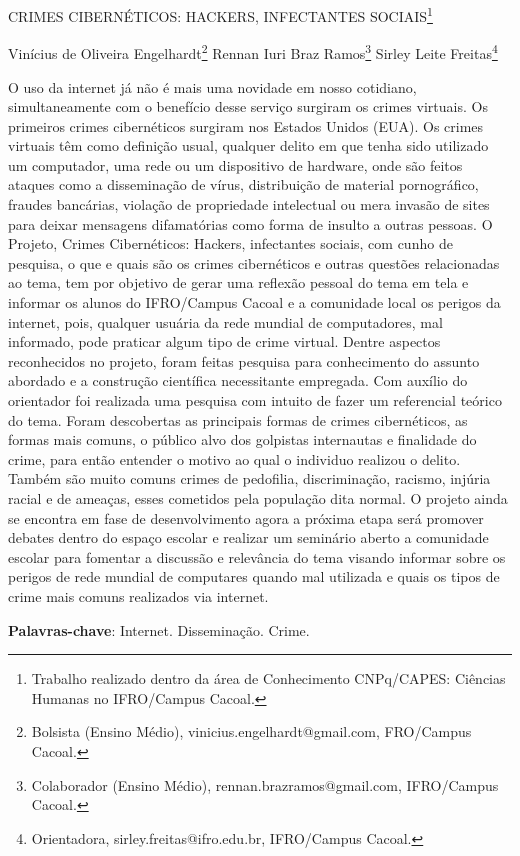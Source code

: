 \documentclass[article,12pt,onesidea,4paper,english,brazil]{abntex2}
\begin{document}
	
	
	\frenchspacing 
	
	\begin{center}
		\LARGE CRIMES CIBERNÉTICOS: HACKERS, INFECTANTES SOCIAIS\footnote{Trabalho realizado dentro da área de Conhecimento CNPq/CAPES: Ciências Humanas no IFRO/Campus Cacoal.}
		
		\normalsize
		Vinícius de Oliveira Engelhardt\footnote{Bolsista (Ensino Médio), vinicius.engelhardt@gmail.com, FRO/Campus Cacoal.} 
		Rennan Iuri Braz Ramos\footnote{Colaborador (Ensino Médio), rennan.brazramos@gmail.com, IFRO/Campus Cacoal.} 
		Sirley Leite Freitas\footnote{Orientadora, sirley.freitas@ifro.edu.br, IFRO/Campus Cacoal.} 
	\end{center}
	
	\noindent O uso da internet já não é mais uma novidade em nosso cotidiano, simultaneamente com o benefício desse serviço surgiram os crimes virtuais. Os primeiros crimes cibernéticos surgiram nos Estados Unidos (EUA). Os crimes virtuais têm como definição usual, qualquer delito em que tenha sido utilizado um computador, uma rede ou um dispositivo de hardware, onde são feitos ataques como a disseminação de vírus, distribuição de material pornográfico, fraudes bancárias, violação de propriedade intelectual ou mera invasão de sites para deixar mensagens difamatórias como forma de insulto a outras pessoas. O Projeto, Crimes Cibernéticos: Hackers, infectantes sociais, com cunho de pesquisa, o que e quais são os crimes cibernéticos e outras questões relacionadas ao tema, tem por objetivo de gerar uma reflexão pessoal do tema em tela e informar os alunos do IFRO/Campus Cacoal e a comunidade local os perigos da internet, pois, qualquer usuária da rede mundial de computadores, mal informado, pode praticar algum tipo de crime virtual. Dentre aspectos reconhecidos no projeto, foram feitas pesquisa para conhecimento do assunto abordado e a construção científica necessitante empregada. Com auxílio do orientador foi realizada uma pesquisa com intuito de fazer um referencial teórico do tema. Foram descobertas as principais formas de crimes cibernéticos, as formas mais comuns, o público alvo dos golpistas internautas e finalidade do crime, para então entender o motivo ao qual o individuo realizou o delito. Também são muito comuns crimes de pedofilia, discriminação, racismo, injúria racial e de ameaças, esses cometidos pela população dita normal. O projeto ainda se encontra em fase de desenvolvimento agora a próxima etapa será promover debates dentro do espaço escolar e realizar um seminário aberto a comunidade escolar para fomentar a discussão e relevância do tema visando informar sobre os perigos de rede mundial de computares quando mal utilizada e quais os tipos de crime mais comuns realizados via internet.
	
	\vspace{\onelineskip}
	
	\noindent
	\textbf{Palavras-chave}: Internet. Disseminação. Crime.
	
\end{document}
